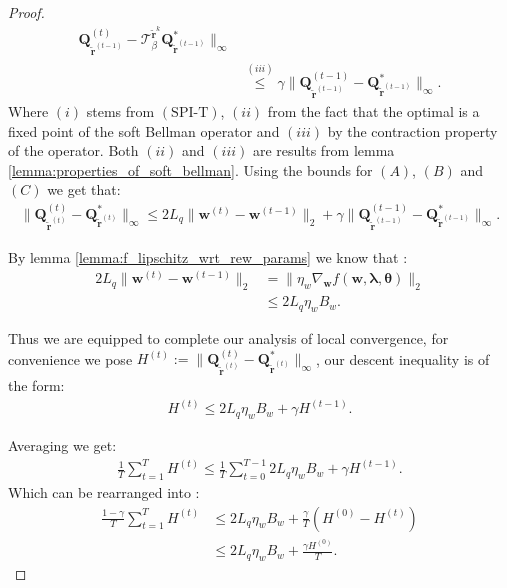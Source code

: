 \begin{proof}
\begin{align*}
    \bm{Q}^{(t)}_{\tilde{\bm{r}}^{(t-1)}}  
    - \mathcal{T}^{\tilde{\bm{r}}^{k}}_\beta
    \bm{Q}^*_{\tilde{\bm{r}}^{(t-1)}} 
    \|_\infty  \\
    & \stackrel{(iii)}{\leq} 
    \gamma
    \|  
    \bm{Q}^{(t-1)}_{\tilde{\bm{r}}^{(t-1)}}  
    -  \bm{Q}^*_{\tilde{\bm{r}}^{(t-1)}} 
    \|_\infty.
\end{align*}
Where $(i)$ stems from $(\text{SPI-T})$, $(ii)$ from the fact that the optimal is a fixed point of the soft Bellman operator and $(iii)$ by the contraction property of the operator. Both $(ii)$ and $(iii)$ are results from lemma \ref{lemma:properties_of_soft_bellman}.
Using the bounds for $(A)$, $(B)$ and $(C)$ we get that: 
\begin{align*}
    \|\bm{Q}^{(t)}_{\tilde{\bm{r}}^{(t)}}- \bm{Q}^*_{\tilde{\bm{r}}^{(t)}} \|_\infty 
    \leq
    2 L_q \| \bm{w}^{(t)} - \bm{w}^{(t-1)} \|_2 + \gamma
    \|  
    \bm{Q}^{(t-1)}_{\tilde{\bm{r}}^{(t-1)}}  
    -  \bm{Q}^*_{\tilde{\bm{r}}^{(t-1)}} 
    \|_\infty.
\end{align*}

By lemma \ref{lemma:f_lipschitz_wrt_rew_params} we know that :
\begin{align*}
    2 L_q \| \bm{w}^{(t)} - \bm{w}^{(t-1)} \|_2 &= 
    \| \eta_w \nabla_{\bm{w}} f(\bm{w},\bm{\lambda},\bm{\theta}) \|_2\\
    &\leq 
    2 L_q \eta_w B_w.
\end{align*}

Thus we are equipped to complete our analysis of local convergence, for convenience we pose $H^{(t)} := \|\bm{Q}^{(t)}_{\tilde{\bm{r}}^{(t)}}- \bm{Q}^*_{\tilde{\bm{r}}^{(t)}} \|_\infty$, our descent inequality is of the form:
\begin{align*}
    H^{(t)} \leq 2 L_q \eta_w B_w + \gamma H^{(t-1)}.
\end{align*}

Averaging we get:
\begin{align*}
   \frac{1}{T} \sum^{T}_{t=1} H^{(t)} \leq
   \frac{1}{T} \sum^{T-1}_{t=0} 2 L_q \eta_w B_w + \gamma H^{(t-1)}.
\end{align*}
Which can be rearranged into :
\begin{align*}
   \frac{1-\gamma}{T} \sum^{T}_{t=1} H^{(t)} 
   &\leq
   2 L_q \eta_w B_w +
   \frac{\gamma}{T} (H^{(0)}-H^{(t)})\\
   &\leq
   2 L_q \eta_w B_w +
   \frac{\gamma H^{(0)}}{T}.
\end{align*}


\end{proof}
